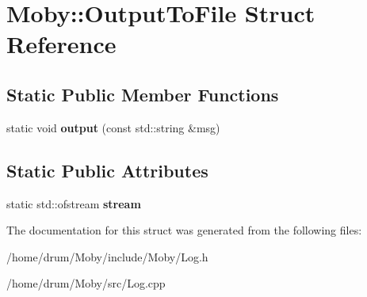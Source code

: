 \section{Moby\-:\-:Output\-To\-File Struct Reference}
\label{structMoby_1_1OutputToFile}
\subsection*{Static Public Member Functions}
\begin{DoxyCompactItemize}
\item 
static void {\bfseries output} (const std\-::string \&msg)\label{structMoby_1_1OutputToFile_a44c6bba677a52dfe1214b04f96c85814}

\end{DoxyCompactItemize}
\subsection*{Static Public Attributes}
\begin{DoxyCompactItemize}
\item 
static std\-::ofstream {\bfseries stream}\label{structMoby_1_1OutputToFile_a74e58c5a617461375ce7e4fadabdf839}

\end{DoxyCompactItemize}


The documentation for this struct was generated from the following files\-:\begin{DoxyCompactItemize}
\item 
/home/drum/\-Moby/include/\-Moby/Log.\-h\item 
/home/drum/\-Moby/src/Log.\-cpp\end{DoxyCompactItemize}
